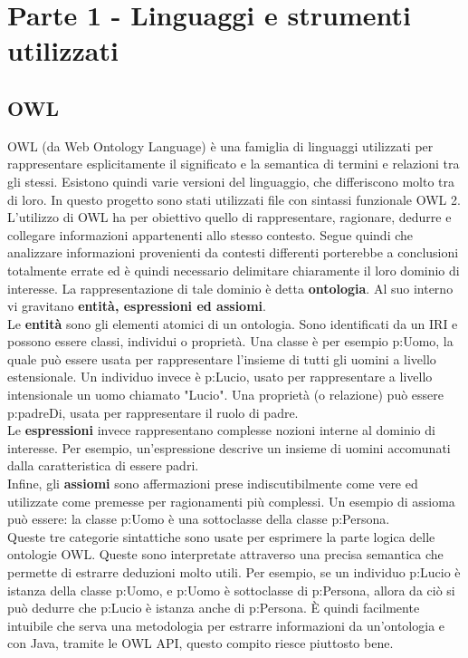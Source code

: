 \documentclass[Lau,binding=0.6cm]{sapthesis}
\begin{document}
\chapter{Parte 1 - Linguaggi e strumenti utilizzati}
\section{OWL}
OWL (da Web Ontology Language) è una famiglia di linguaggi utilizzati per rappresentare esplicitamente il significato e la semantica di termini e relazioni tra gli stessi. Esistono quindi varie versioni del linguaggio, che differiscono molto tra di loro. In questo progetto sono stati utilizzati file con sintassi funzionale OWL 2. L'utilizzo di OWL ha per obiettivo quello di rappresentare, ragionare, dedurre e collegare informazioni appartenenti allo stesso contesto. Segue quindi che analizzare informazioni provenienti da contesti differenti porterebbe a conclusioni totalmente errate ed è quindi necessario delimitare chiaramente il loro dominio di interesse. La rappresentazione di tale dominio è detta \textbf{ontologia}. Al suo interno vi gravitano \textbf{entità, espressioni ed assiomi}.
\\Le \textbf{entità} sono gli elementi atomici di un ontologia. Sono identificati da un IRI e possono essere classi, individui o proprietà. 
	Una classe è per esempio p:Uomo, la quale può essere usata per rappresentare l'insieme di tutti gli uomini a livello 			estensionale.	
    Un individuo invece è p:Lucio, usato per rappresentare a livello intensionale un uomo chiamato "Lucio". 
	Una proprietà (o relazione) può essere p:padreDi, usata per rappresentare il ruolo di padre.
\\Le \textbf{espressioni} invece rappresentano complesse nozioni interne al dominio di interesse. Per esempio, un'espressione descrive un insieme di uomini accomunati dalla caratteristica di essere padri.
\\Infine, gli \textbf{assiomi} sono affermazioni prese indiscutibilmente come vere ed utilizzate come premesse per ragionamenti più complessi. Un esempio di assioma può essere: la classe p:Uomo è una sottoclasse della classe p:Persona.
\\Queste tre categorie sintattiche sono usate per esprimere la parte logica delle ontologie OWL. Queste sono interpretate attraverso una precisa semantica che permette di estrarre deduzioni molto utili. Per esempio, se un individuo p:Lucio è istanza 
della classe p:Uomo, e p:Uomo è sottoclasse di p:Persona, allora da ciò si può dedurre che p:Lucio è istanza anche di p:Persona.
È quindi facilmente intuibile che serva una metodologia per estrarre informazioni da un'ontologia e con Java, tramite le OWL API, questo compito riesce piuttosto bene.
\end{document}
